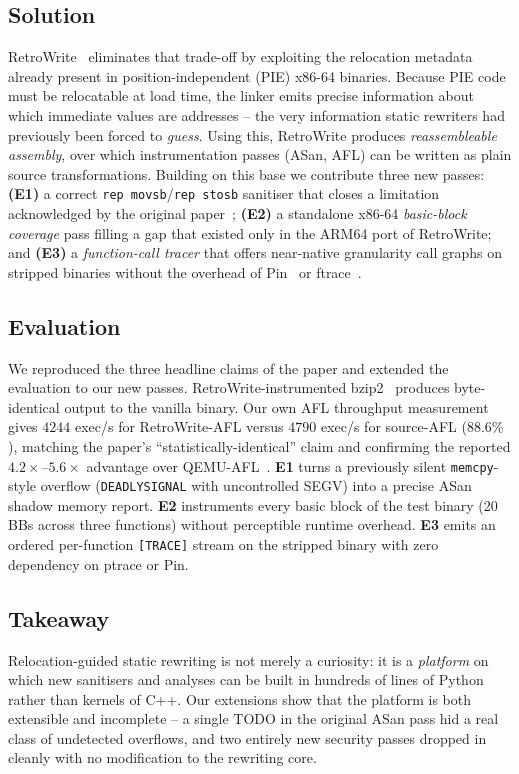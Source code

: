 \documentclass[10pt,a4paper]{article}
\begin{document}
\subsection{Solution}
RetroWrite~\cite{retrowrite} eliminates that trade-off by exploiting the
relocation metadata already present in position-independent (PIE) x86-64
binaries. Because PIE code must be relocatable at load time, the linker emits
precise information about which immediate values are addresses -- the very
information static rewriters had previously been forced to \emph{guess}. Using
this, RetroWrite produces \emph{reassembleable assembly}, over which
instrumentation passes (ASan, AFL) can be written as plain source
transformations. Building on this base we contribute three new passes:
\textbf{(E1)} a correct \texttt{rep movsb}/\texttt{rep stosb} sanitiser that
closes a limitation acknowledged by the original paper~\cite{retrowrite};
\textbf{(E2)} a standalone x86-64 \emph{basic-block coverage} pass filling a
gap that existed only in the ARM64 port of RetroWrite; and \textbf{(E3)} a
\emph{function-call tracer} that offers near-native granularity call graphs on
stripped binaries without the overhead of Pin~\cite{pin} or ftrace~\cite{ftrace}.

\subsection{Evaluation}
We reproduced the three headline claims of the paper and extended the
evaluation to our new passes. RetroWrite-instrumented bzip2~\cite{bzip2}
produces byte-identical output to the vanilla binary. Our own AFL
throughput measurement gives $4244$ exec/s for RetroWrite-AFL versus $4790$
exec/s for source-AFL ($88.6\%$), matching the paper's
``statistically-identical'' claim and confirming the reported
$4.2\times$--$5.6\times$ advantage over QEMU-AFL~\cite{retrowrite}.
\textbf{E1} turns a previously silent \texttt{memcpy}-style overflow
(\texttt{DEADLYSIGNAL} with uncontrolled SEGV) into a precise ASan shadow
memory report. \textbf{E2} instruments every basic block of the test binary
(20 BBs across three functions) without perceptible runtime overhead.
\textbf{E3} emits an ordered per-function \texttt{[TRACE]} stream on the
stripped binary with zero dependency on ptrace or Pin.

\subsection{Takeaway}
Relocation-guided static rewriting is not merely a curiosity: it is a
\emph{platform} on which new sanitisers and analyses can be built in hundreds
of lines of Python rather than kernels of C++. Our extensions show that the
platform is both extensible and incomplete -- a single TODO in the original
ASan pass hid a real class of undetected overflows, and two entirely new
security passes dropped in cleanly with no modification to the rewriting core.
\end{document}
